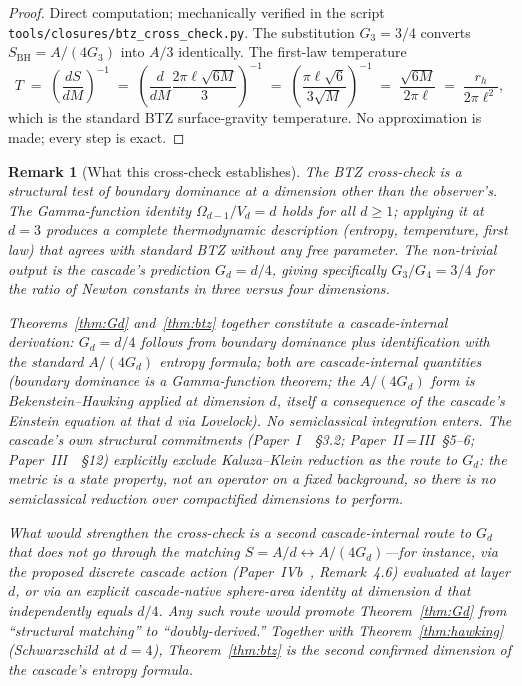 \documentclass[12pt,a4paper]{article}
\newtheorem*{remark}{Remark}
\begin{document}
\begin{proof}
Direct computation; mechanically verified in the script
\texttt{tools/\allowbreak closures/\allowbreak btz\_cross\_check.py}.
The substitution
$G_3 = 3/4$ converts $S_{\mathrm{BH}} = A/(4G_3)$ into $A/3$ identically.
The first-law temperature
\[
T \;=\; \left(\frac{dS}{dM}\right)^{-1}
\;=\; \left(\frac{d}{dM}\frac{2\pi\ell\sqrt{6M}}{3}\right)^{-1}
\;=\; \left(\frac{\pi\ell\sqrt{6}}{3\sqrt{M}}\right)^{-1}
\;=\; \frac{\sqrt{6M}}{2\pi\ell}
\;=\; \frac{r_h}{2\pi\ell^2},
\]
which is the standard BTZ surface-gravity temperature. No approximation
is made; every step is exact.
\end{proof}

\begin{remark}[What this cross-check establishes]
The BTZ cross-check is a \emph{structural} test of boundary dominance at a
dimension other than the observer's. The Gamma-function identity
$\Omega_{d-1}/V_d = d$ holds for all $d \geq 1$; applying it at $d=3$
produces a complete thermodynamic description (entropy, temperature,
first law) that agrees with standard BTZ without any free parameter. The
non-trivial output is the cascade's prediction $G_d = d/4$, giving
specifically $G_3/G_4 = 3/4$ for the ratio of Newton constants in three
versus four dimensions.

Theorems~\ref{thm:Gd} and~\ref{thm:btz} together constitute a
cascade-internal derivation: $G_d = d/4$ follows from boundary dominance
plus identification with the standard $A/(4G_d)$ entropy formula; both
are cascade-internal quantities (boundary dominance is a Gamma-function
theorem; the $A/(4G_d)$ form is Bekenstein--Hawking applied at dimension
$d$, itself a consequence of the cascade's Einstein equation at that $d$
via Lovelock). No semiclassical integration enters. The cascade's own
structural commitments (Paper~I~\cite{part1}~\S3.2;
Paper~II\,=\,III~\S5--6; Paper~III~\cite{part3}~\S12) explicitly
\emph{exclude} Kaluza--Klein reduction as the route to $G_d$: the metric
is a state property, not an operator on a fixed background, so there is
no semiclassical reduction over compactified dimensions to perform.

What would strengthen the cross-check is a \emph{second} cascade-internal
route to $G_d$ that does not go through the matching
$S = A/d \leftrightarrow A/(4G_d)$---for instance, via the proposed
discrete cascade action (Paper~IVb~\cite{part4b}, Remark~4.6) evaluated
at layer $d$, or via an explicit cascade-native sphere-area identity at
dimension $d$ that independently equals $d/4$. Any such route would
promote Theorem~\ref{thm:Gd} from ``structural matching'' to
``doubly-derived.'' Together with Theorem~\ref{thm:hawking}
(Schwarzschild at $d=4$), Theorem~\ref{thm:btz} is the second confirmed
dimension of the cascade's entropy formula.
\end{remark}
\end{document}
